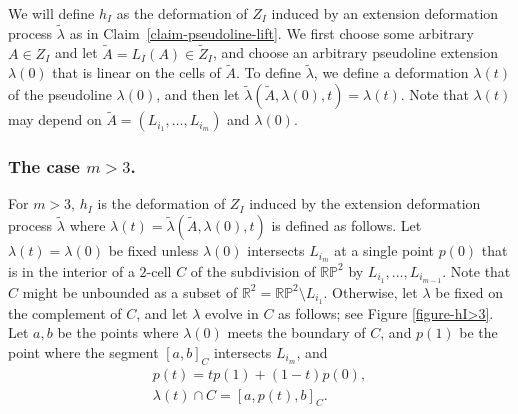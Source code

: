 \documentclass[11pt]{article}
\numberwithin{equation}{section}
\theoremstyle{remark}
\let\mb\mathbb
\newcommand{\projplane}{\mb{RP}^2}
\begin{document}
We will define $h_I$ as the deformation of $Z_I$ induced by an extension deformation process $\tilde \lambda$ as in Claim~\ref{claim-pseudoline-lift}.
We first choose some arbitrary $A \in Z_{I}$ and let $\tilde A = L_I(A) \in \tilde Z_{I}$, and choose an arbitrary pseudoline extension $\lambda(0)$ that is linear on the cells of $\tilde A$. To define $\tilde \lambda$, we define a deformation $\lambda(t)$ of the pseudoline $\lambda(0)$, and then let $\tilde \lambda(\tilde A,\lambda(0),t) = \lambda(t)$. Note that $\lambda(t)$ may depend on $\tilde A = (L_{i_1},\dots,L_{i_m})$ and $\lambda(0)$.

\subsubsection*{The case $m>3$.}
For $m >3$, $h_I$ is the deformation of $Z_I$ induced by the extension deformation process $\tilde \lambda$ where $\lambda(t) = \tilde \lambda(\tilde A, \lambda(0), t)$ is defined as follows.
Let $\lambda(t) = \lambda(0)$ be fixed unless $\lambda(0)$ intersects $L_{i_m}$ at a single point $p(0)$ that is in the interior of a $2$-cell $C$ of the subdivision of $\projplane$ by $L_{i_1},\dots,L_{i_{m-1}}$.
Note that $C$ might be unbounded as a subset of $\mb{R}^2 = \projplane\setminus L_{i_1}$.
Otherwise, let $\lambda$ be fixed on the complement of $C$, and let $\lambda$ evolve in $C$ as follows; see Figure \ref{figure-hI>3}.
Let $a,b$ be the points where $\lambda(0)$ meets the boundary of $C$, and
$p(1)$ be the point where the segment $[a,b]_{C}$ intersects $L_{i_m}$,
and
\begin{gather*}
p(t) = t p(1) + (1-t) p(0), \\
\lambda(t) \cap C = \left[a,p(t),b\right]_{C}.
\end{gather*}
\end{document}

